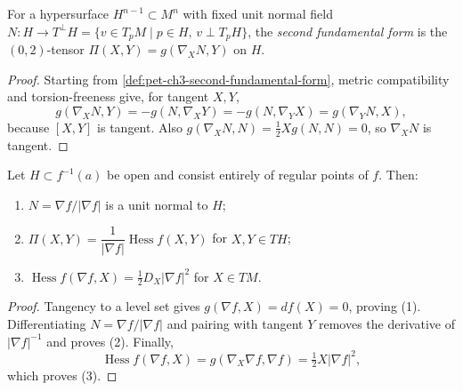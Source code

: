 \begin{definition}
  \label{def:pet-ch3-second-fundamental-form}


  For a hypersurface $H^{n-1}\subset M^n$ with fixed unit normal field
  $N:H\to T^\perp H=\{v\in T_pM\mid p\in H,\,v\perp T_pH\}$, the \emph{second
  fundamental form} is the $(0,2)$-tensor $\Pi(X,Y)=g(\nabla_XN,Y)$ on $H$.
\end{definition}
\begin{proof}

  \sketch
  Starting from \cref{def:pet-ch3-second-fundamental-form}, metric compatibility
  and torsion-freeness give, for tangent $X,Y$,
  \[
   g(\nabla_XN,Y)=-g(N,\nabla_XY)
   =-g(N,\nabla_YX)=g(\nabla_YN,X),
  \]
  because $[X,Y]$ is tangent. Also
  $g(\nabla_XN,N)=\tfrac12Xg(N,N)=0$, so $\nabla_XN$ is tangent.
\end{proof}

\begin{proposition}
  \label{prop:pet-ch3-normal-hessian-relation}


  Let $H\subset f^{-1}(a)$ be open and consist entirely of regular points of $f$.
  Then:
  \begin{enumerate}
    \item[(1)] $N=\nabla f/|\nabla f|$ is a unit normal to $H$;
    \item[(2)] $\Pi(X,Y)=\dfrac1{|\nabla f|}\operatorname{Hess}f(X,Y)$ for
    $X,Y\in TH$;
    \item[(3)] $\operatorname{Hess}f(\nabla f,X)=\tfrac12D_X|\nabla f|^2$ for
    $X\in TM$.
  \end{enumerate}
\end{proposition}
\begin{proof}

  \sketch
  Tangency to a level set gives $g(\nabla f,X)=df(X)=0$, proving (1).
  Differentiating $N=\nabla f/|\nabla f|$ and pairing with tangent $Y$ removes the
  derivative of $|\nabla f|^{-1}$ and proves (2). Finally,
  \[
   \operatorname{Hess}f(\nabla f,X)
   =g(\nabla_X\nabla f,\nabla f)
   =\tfrac12X|\nabla f|^2,
  \]
  which proves (3).
\end{proof}

